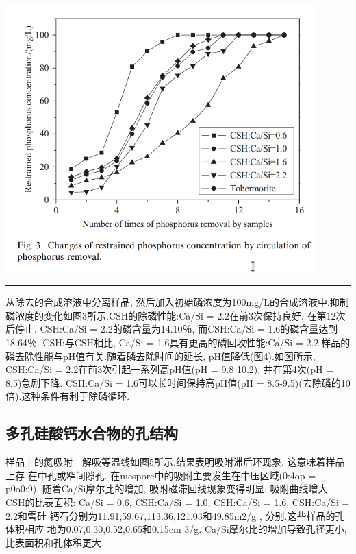 \documentclass[11pt]{article}
\begin{document}
\includegraphics[width=0.9\textwidth]{fig.3.png}
 \label{tab:title}

\noindent\rule{\textwidth}{0.5pt}



从除去的合成溶液中分离样品, 然后加入初始磷浓度为100mg/L的合成溶液中.抑制磷浓度的变化如图3所示.CSH的除磷性能:Ca/Si = 2.2在前3次保持良好, 在第12次后停止. CSH:Ca/Si = 2.2的磷含量为14.10％, 而CSH:Ca/Si = 1.6的磷含量达到18.64％. CSH:与CSH相比, Ca/Si = 1.6具有更高的磷回收性能:Ca/Si = 2.2.样品的磷去除性能与pH值有关.随着磷去除时间的延长, pH值降低(图4).如图所示, CSH:Ca/Si = 2.2在前3次引起一系列高pH值(pH = 9.8 10.2), 并在第4次(pH = 8.5)急剧下降. CSH:Ca/Si = 1.6可以长时间保持高pH值(pH = 8.5-9.5)(去除磷的10倍).这种条件有利于除磷循环.

\subsection{多孔硅酸钙水合物的孔结构}
\label{sec:org3353af1}
样品上的氮吸附 - 解吸等温线如图5所示.结果表明吸附滞后环现象. 这意味着样品上存
在中孔或窄间隙孔\cite{Poreestructure_and_surface_fractal_characteristics_of_calcium_silicate_hydrates_contained_organic_macromolecule}. 在mespore中的吸附主要发生在中压区域(0:4op = p0o0:9).
随着Ca/Si摩尔比的增加, 吸附磁滞回线现象变得明显, 吸附曲线增大. CSH的比表面积:
Ca/Si = 0.6, CSH:Ca/Si = 1.0, CSH:Ca/Si = 1.6, CSH:Ca/Si = 2.2和雪硅
钙石分别为11.91,59.67,113.36,121.03和49.85m2/g , 分别.这些样品的孔体积相应
地为0.07,0.30,0.52,0.65和0.15cm 3/g. Ca/Si摩尔比的增加导致孔径更小, 比表面积和孔体积更大.
\end{document}
